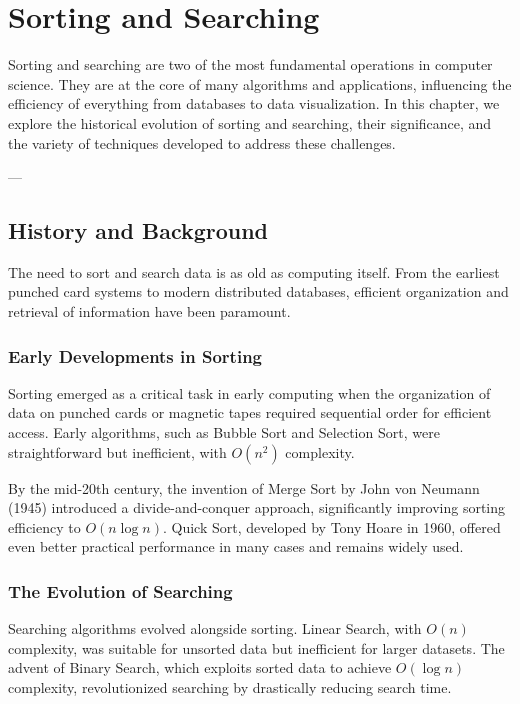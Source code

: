 
\chapter{Sorting and Searching}
\label{chap:Sorting_and_Searching}

Sorting and searching are two of the most fundamental operations in computer science. They are at the core of many algorithms and applications, influencing the efficiency of everything from databases to data visualization. In this chapter, we explore the historical evolution of sorting and searching, their significance, and the variety of techniques developed to address these challenges.

---

\section*{History and Background}

The need to sort and search data is as old as computing itself. From the earliest punched card systems to modern distributed databases, efficient organization and retrieval of information have been paramount.

\subsection*{Early Developments in Sorting}
Sorting emerged as a critical task in early computing when the organization of data on punched cards or magnetic tapes required sequential order for efficient access. Early algorithms, such as Bubble Sort and Selection Sort, were straightforward but inefficient, with \( O(n^2) \) complexity.

By the mid-20th century, the invention of Merge Sort by John von Neumann (1945) introduced a divide-and-conquer approach, significantly improving sorting efficiency to \( O(n \log n) \). Quick Sort, developed by Tony Hoare in 1960, offered even better practical performance in many cases and remains widely used.

\subsection*{The Evolution of Searching}
Searching algorithms evolved alongside sorting. Linear Search, with \( O(n) \) complexity, was suitable for unsorted data but inefficient for larger datasets. The advent of Binary Search, which exploits sorted data to achieve \( O(\log n) \) complexity, revolutionized searching by drastically reducing search time.


